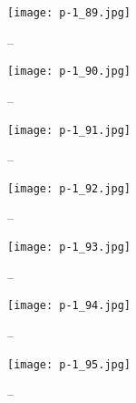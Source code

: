 \clearpage


\begin{figure}
    \begin{center}
        \texttt{[image: p-1\_89.jpg]}
        \caption{--}
    \end{center}
\end{figure}

\clearpage


\begin{figure}
    \begin{center}
        \texttt{[image: p-1\_90.jpg]}
        \caption{--}
    \end{center}
\end{figure}

\clearpage


\begin{figure}
    \begin{center}
        \texttt{[image: p-1\_91.jpg]}
        \caption{--}
    \end{center}
\end{figure}

\clearpage


\begin{figure}
    \begin{center}
        \texttt{[image: p-1\_92.jpg]}
        \caption{--}
    \end{center}
\end{figure}

\clearpage


\begin{figure}
    \begin{center}
        \texttt{[image: p-1\_93.jpg]}
        \caption{--}
    \end{center}
\end{figure}

\clearpage


\begin{figure}
    \begin{center}
        \texttt{[image: p-1\_94.jpg]}
        \caption{--}
    \end{center}
\end{figure}

\clearpage


\begin{figure}
    \begin{center}
        \texttt{[image: p-1\_95.jpg]}
        \caption{--}
    \end{center}
\end{figure}

